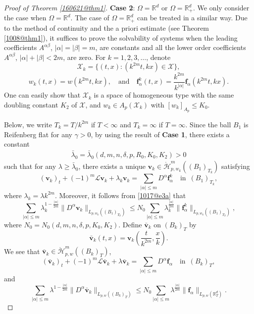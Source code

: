 \documentclass[reqno]{amsart}
\numberwithin{equation}{section}
\theoremstyle{plain}
\theoremstyle{definition}
\theoremstyle{remark}
\begin{document}
\begin{proof}[Proof of Theorem \ref{160621@thm1}]
\noindent
{\bf{Case 2}}: $\Omega={\mathbb{R}}^d$ or $\Omega={\mathbb{R}}^d_+$.
We only consider the case when $\Omega={\mathbb{R}}^d$.
The case of $\Omega={\mathbb{R}}^d_+$ can be treated in a similar way.
Due to the method of continuity and the a priori estimate (see Theorem \ref{1008@thm1}), it suffices to prove the solvability of systems when the leading coefficients $A^{\alpha\beta}$, $|\alpha|=|\beta|=m$, are constants and all the lower order coefficients $A^{\alpha\beta}$, $|\alpha|+|\beta|<2m$, are zero.
For $k=1,2,3,\ldots$, denote
$$
{\mathcal{X}}_k=\{(t,x): (k^{2m}t,kx)\in {\mathcal{X}}\},
$$
$$
w_k(t,x)=w(k^{2m}t,kx), \quad \text{and}\quad  {\boldsymbol{f}}_\alpha^k(t,x)=\frac{k^{2m}}{k^{|\alpha|}}{\boldsymbol{f}}_\alpha(k^{2m}t, kx).
$$
One can easily show that ${\mathcal{X}}_k$ is a space of homogeneous type with the same doubling constant $K_2$ of ${\mathcal{X}}$, and $w_k\in A_p({\mathcal{X}}_k)$ with $[w_k]_{A_p}\le K_0$.

Below, we write $T_k=T/k^{2m}$ if $T<\infty$ and $T_k=\infty$ if $T=\infty$.
Since the ball $B_1$ is Reifenberg flat for any $\gamma>0$,
by using the result of {\bf{Case 1}}, there exists a constant
\begin{align*}
\bar\lambda_0=\bar\lambda_0(d,m,n,\delta,p,R_0,K_0,K_2)>0
\end{align*}
such that for any $\lambda\ge \bar{\lambda}_0$, there exists a unique ${\boldsymbol{v}}_k\in \mathring{\mathcal{H}}^m_{p,w_k}((B_1)_{T_k})$ satisfying
$$
({\boldsymbol{v}}_k)_t+(-1)^m{\mathcal{L}} {\boldsymbol{v}}_k+\lambda_k {\boldsymbol{v}}_k=\sum_{|\alpha|\le m}D^\alpha {\boldsymbol{f}}_\alpha^k \quad \text{in }\, (B_1)_{T_k},
$$
where $\lambda_k=\lambda k^{2m}$.
Moreover, it follows from \eqref{1017@e3a} that 
\begin{equation*}		
\sum_{|\alpha|\le m}\lambda_k^{1-\frac{|\alpha|}{2m}}\|D^\alpha {\boldsymbol{v}}_k\|_{L_{p,w_k}((B_1)_{T_k})}\le N_0\sum_{|\alpha|\le m}\lambda_k^{\frac{|\alpha|}{2m}}\|{\boldsymbol{f}}_\alpha^k\|_{L_{p,w_k}((B_1)_{T_k})},
\end{equation*}
where $N_0=N_0(d,m,n,\delta,p,K_0,K_2)$.
Define $\bar{{\boldsymbol{v}}}_k$ on $(B_k)_T$ by 
$$
\bar{{\boldsymbol{v}}}_k(t,x)={\boldsymbol{v}}_k\left(\frac{t}{k^{2m}}, \frac{x}{k}\right).
$$ 
We see that $\bar{{\boldsymbol{v}}}_k\in \mathring{\mathcal{H}}^m_{p,w}((B_k)_T)$,   
$$
(\bar{{\boldsymbol{v}}}_k)_t+(-1)^m{\mathcal{L}} \bar{{\boldsymbol{v}}}_k+\lambda \bar{{\boldsymbol{v}}}_k=\sum_{|\alpha|\le m}D^\alpha {\boldsymbol{f}}_\alpha \quad \text{in }\, (B_k)_{T},
$$
and
\begin{equation}		\label{160805@Eq1}
 \sum_{|\alpha|\le m}\lambda^{1-\frac{|\alpha|}{2m}}\|D^\alpha \bar{{\boldsymbol{v}}}_k\|_{L_{p,w}((B_k)_T)}
\le N_0\sum_{|\alpha|\le m}\lambda^{\frac{|\alpha|}{2m}}\|{\boldsymbol{f}}_\alpha\|_{L_{p,w}({\mathbb{R}}^{d}_T)}.
\end{equation}


\end{proof}
\end{document}
